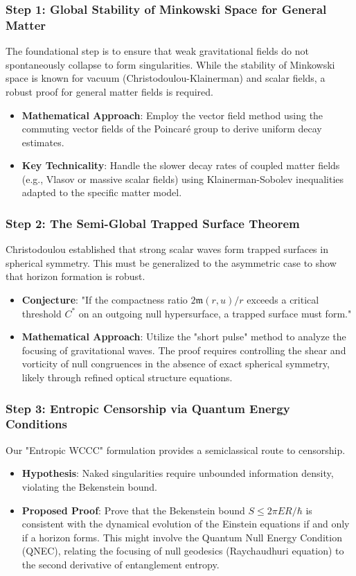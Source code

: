 \documentclass[12pt,a4paper]{article}
\begin{document}
\subsubsection{Step 1: Global Stability of Minkowski Space for General Matter}
The foundational step is to ensure that weak gravitational fields do not spontaneously collapse to form singularities. While the stability of Minkowski space is known for vacuum (Christodoulou-Klainerman) and scalar fields, a robust proof for general matter fields is required.
\begin{itemize}
    \item \textbf{Mathematical Approach}: Employ the vector field method using the commuting vector fields of the Poincaré group to derive uniform decay estimates.
    \item \textbf{Key Technicality}: Handle the slower decay rates of coupled matter fields (e.g., Vlasov or massive scalar fields) using Klainerman-Sobolev inequalities adapted to the specific matter model.
\end{itemize}

\subsubsection{Step 2: The Semi-Global Trapped Surface Theorem}
Christodoulou established that strong scalar waves form trapped surfaces in spherical symmetry. This must be generalized to the asymmetric case to show that horizon formation is robust.
\begin{itemize}
    \item \textbf{Conjecture}: "If the compactness ratio $2\mathfrak{m}(r,u)/r$ exceeds a critical threshold $C^*$ on an outgoing null hypersurface, a trapped surface must form."
    \item \textbf{Mathematical Approach}: Utilize the "short pulse" method to analyze the focusing of gravitational waves. The proof requires controlling the shear and vorticity of null congruences in the absence of exact spherical symmetry, likely through refined optical structure equations.
\end{itemize}

\subsubsection{Step 3: Entropic Censorship via Quantum Energy Conditions}
Our "Entropic WCCC" formulation provides a semiclassical route to censorship.
\begin{itemize}
    \item \textbf{Hypothesis}: Naked singularities require unbounded information density, violating the Bekenstein bound.
    \item \textbf{Proposed Proof}: Prove that the Bekenstein bound $S \leq 2\pi E R / \hbar$ is consistent with the dynamical evolution of the Einstein equations if and only if a horizon forms. This might involve the Quantum Null Energy Condition (QNEC), relating the focusing of null geodesics (Raychaudhuri equation) to the second derivative of entanglement entropy.
\end{itemize}
\end{document}
